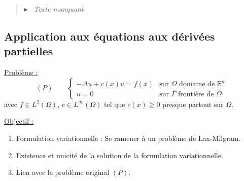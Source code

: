 \documentclass[12pt,a4paper]{article}
\newcommand{\preuve}[1]{%
    \begin{quote}
        $\blacktriangleright$~#1
    \end{quote}
}
\newcommand{\important}[1]{%
    \begin{tcolorbox}[colback=red!10!white,colframe=red!30!black]
        #1
    \end{tcolorbox}
}
\begin{document}
\preuve{
    \textit{Texte manquant}
}


\subsection{Application aux équations aux dérivées partielles}

\important{
    \underline{Problème :}
    \begin{equation}
        (P) \qquad
        \begin{cases}
            -\Delta u + c(x)u = f(x) & \text{sur } \Omega \text{ domaine de } \mathbb{R}^n \\
            u = 0 & \text{sur } \Gamma \text{ frontière de } \Omega
        \end{cases}
    \end{equation}
    avec $f \in L^2(\Omega)$, $c \in L^{\infty}(\Omega)$ tel que $c(x) \geq 0$ presque partout sur $\Omega$.
}

\underline{Objectif :}
\begin{enumerate}
    \item Formulation variationnelle : Se ramener à un problème de Lax-Milgram.
    \item Existence et unicité de la solution de la formulation variationnelle.
    \item Lien avec le problème original $(P)$.
\end{enumerate}
\end{document}
